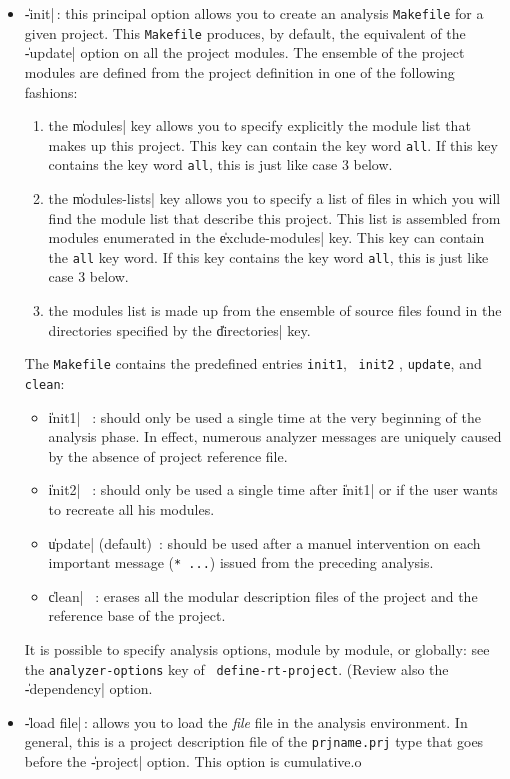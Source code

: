 \begin{itemize}
\item {\Large \|-init|}\,: this principal option allows you to create an analysis {\tt Makefile} for a given project.  This {\tt Makefile} produces, by default, the equivalent of the \|-update| option on all the project modules.
The ensemble of the project modules are defined from the project definition in one of the following fashions:
\begin{enumerate}
\item the \|modules| key allows you to specify explicitly the module list that makes up this project.  This key can contain the key word {\tt all}.  If this key contains the key word {\tt all}, this is just like case 3 below.
\item the \|modules-lists| key allows you to specify a list of files
in which you will find the module list that describe this project.  This list is assembled from modules enumerated in the \|exclude-modules| key.
This key can contain the {\tt all} key word.   If this key contains the key word {\tt all}, this is just like case 3 below.
\item the modules list is made up from the ensemble of source files found in the directories specified by the \|directories| key.
\end{enumerate}

The {\tt Makefile} contains the predefined entries {\tt init1}, {\tt
init2} , {\tt update}, and {\tt clean}:
\begin{itemize}
\item \|init1| \ : should only be used
a single time at the very beginning of the analysis phase. In effect, numerous analyzer messages are uniquely caused by the absence of project reference file. 
\item \|init2| \ : should only be used
a single time after \|init1| or if the user wants to recreate all his modules. 
\item \|update| (default)\ :  should be used after a manuel intervention on each important message ({\tt ** ...}) issued from the preceding analysis.
\item \|clean| \ : erases all the modular description files of the project and the reference base of the project.
\end{itemize}
It is possible to specify analysis options, module by module, or globally:  see the {\tt analyzer-options} key of {\tt
define-rt-project}.  (Review also the \|-dependency| option.

\item {\Large \|-load file|}\,: allows you to load the {\em file} file in the analysis environment.  In general, this is a project description file of the {\tt prjname.prj} type that goes before the \|-project| option.  This option is cumulative.o


\end{itemize}
